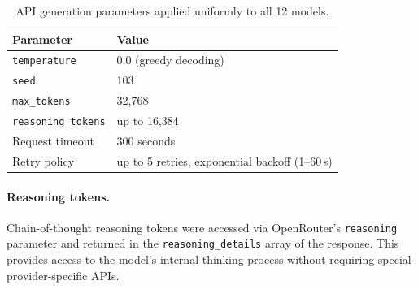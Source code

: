 \begin{table}[H]
  \centering
  \caption{API generation parameters applied uniformly to all 12 models.}
  \label{tab:api_config}
  \small
  \begin{tabular}{ll}
    \toprule
    \textbf{Parameter} & \textbf{Value} \\
    \midrule
    \texttt{temperature}    & 0.0 (greedy decoding) \\
    \texttt{seed}           & 103 \\
    \texttt{max\_tokens}    & 32,768 \\
    \texttt{reasoning\_tokens} & up to 16,384 \\
    Request timeout         & 300 seconds \\
    Retry policy            & up to 5 retries, exponential backoff (1--60\,s) \\
    \bottomrule
  \end{tabular}
\end{table}

\paragraph{Reasoning tokens.} Chain-of-thought reasoning tokens were accessed via OpenRouter's \texttt{reasoning} parameter and returned in the \texttt{reasoning\_details} array of the response. This provides access to the model's internal thinking process without requiring special provider-specific APIs.

